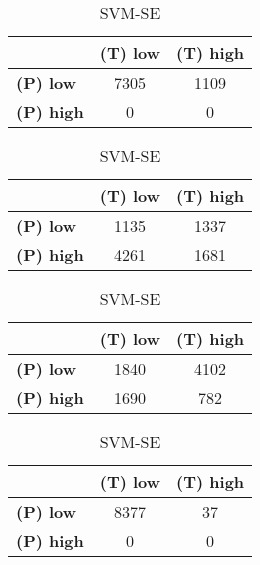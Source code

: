 \begin{landscape}
\begin{table}[htbp]
\centering
\caption{PCA_ELR__04 RP2}
\begin{minipage}{.3\textwidth}
\tiny
\caption*{SVM-AP}
\begin{tabular}{|l|c|c|}
\hline
					& \textbf{(T) low}	& \textbf{(T) high}	\\ \hline
\textbf{(P) low}	& 7305				& 1109				\\ \hline
\textbf{(P) high}	& 0					& 0					\\ \hline
\end{tabular}
\end{minipage}\hfill
\begin{minipage}{.3\textwidth}
\tiny
\caption*{SVM-AT}
\begin{tabular}{|l|c|c|}
\hline
					& \textbf{(T) low}	& \textbf{(T) high}	\\ \hline
\textbf{(P) low}	& 1135				& 1337				\\ \hline
\textbf{(P) high}	& 4261				& 1681				\\ \hline
\end{tabular}
\end{minipage}\hfill
\begin{minipage}{.3\textwidth}
\tiny
\caption*{SVM-PL}
\begin{tabular}{|l|c|c|}
\hline
					& \textbf{(T) low}	& \textbf{(T) high}	\\ \hline
\textbf{(P) low}	& 1840				& 4102				\\ \hline
\textbf{(P) high}	& 1690				& 782				\\ \hline
\end{tabular}
\end{minipage}\hfill
\begin{minipage}{.3\textwidth}
\tiny
\caption*{SVM-SE}
\begin{tabular}{|l|c|c|}
\hline
					& \textbf{(T) low}	& \textbf{(T) high}	\\ \hline
\textbf{(P) low}	& 8377				& 37				\\ \hline
\textbf{(P) high}	& 0					& 0					\\ \hline
\end{tabular}
\end{minipage}\hfill
\end{table}
\begin{table}[htbp]
\centering
\begin{minipage}{.3\textwidth}
\tiny
\caption*{MLP-AP}

\end{minipage}
\end{table}
\end{landscape}
